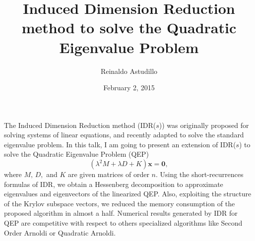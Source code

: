 \documentclass{article}
\title{Induced Dimension Reduction method to solve the Quadratic Eigenvalue Problem}
\author{Reinaldo Astudillo}
\affil{PhD student at TU Delft, The Netherlands}
\date{February 2, 2015}
\newcommand{\vv}[1]{\mathbf{#1}}
\begin{document}
\maketitle
    The Induced Dimension Reduction method (IDR($s$)) was
    originally proposed for solving systems of linear equations, and recently adapted 
    to solve the standard eigenvalue problem. In this talk,  I am going to present an extension of IDR($s$) to solve the Quadratic Eigenvalue Problem (QEP) 
    $$(\lambda^2 M + \lambda D + K)\vv{x} = \vv{0},$$
    where $M,\, D,$ and $K$ are given matrices of order $n$. Using the short-recurrences formulas of IDR, we obtain a Hessenberg decomposition to approximate eigenvalues and eigenvectors 
    of the linearized QEP. Also, exploiting the structure of the Krylov subspace vectors, we reduced the memory consumption of the proposed algorithm in almost a half.
    Numerical results generated by IDR for QEP  are competitive with respect to others specialized algorithms  
    like Second Order Arnoldi or Quadratic Arnoldi.
\end{document}

